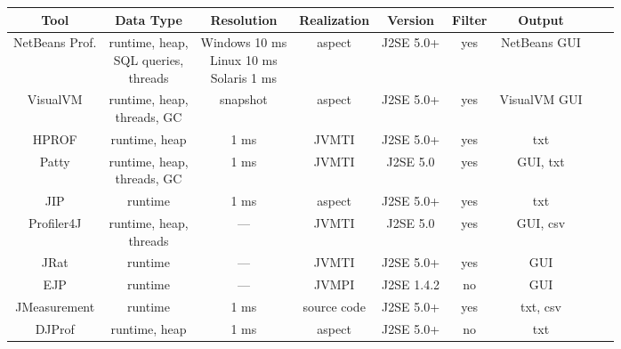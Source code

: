 \begin{sidewaystable}

    \begin{tabular}{*{9}{c}}
    	\toprule
        Tool & Data Type & Resolution & Realization & Version & Filter & Output \\
        \midrule
        NetBeans Prof. & \makecell{runtime, heap, \\ SQL queries, \\ threads} & \makecell{Windows 10 ms \\ Linux 10 ms \\ Solaris 1 ms} & aspect & J2SE 5.0+ & yes & NetBeans GUI \\
        \midrule
        VisualVM & \makecell{runtime, heap, \\ threads, GC} & snapshot & aspect & J2SE 5.0+ & yes & VisualVM GUI \\
        \midrule
        HPROF & runtime, heap & 1 ms & JVMTI & J2SE 5.0+ & yes & txt \\
        \midrule
        Patty & \makecell{runtime, heap, \\ threads, GC} & 1 ms & JVMTI & J2SE 5.0 & yes & GUI, txt \\
        \midrule
        JIP & runtime & 1 ms & aspect & J2SE 5.0+ & yes & txt \\
        \midrule
        Profiler4J & \makecell{runtime, heap, \\ threads} & --- & JVMTI & J2SE 5.0 & yes & GUI, csv \\
        \midrule
        JRat & runtime & --- & JVMTI & J2SE 5.0+ & yes & GUI \\
        \midrule
        EJP & runtime & --- & JVMPI & J2SE 1.4.2 & no & GUI \\
        \midrule
        JMeasurement & runtime & 1 ms & source code & J2SE 5.0+ & yes & txt, csv \\
        \midrule
        DJProf & runtime, heap & 1 ms & aspect & J2SE 5.0+ & no & txt \\


        \bottomrule
    \end{tabular}
    \label{java_monitoring_tools}
\end{sidewaystable}

